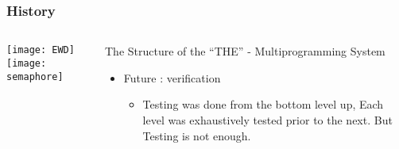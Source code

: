 \begin{frame}[plain]
	\frametitle{History}
	
	
	
	\begin{columns}
		
		\begin{column}{.4\textwidth}
			\centering
			\texttt{[image: EWD]}
			\texttt{[image: semaphore]}
			
			
			
		\end{column}
		
		\begin{column}{.6\textwidth}
			
			The Structure of the “THE” - Multiprogramming System
			\begin{itemize}
				\item Future : verification
				
				\begin{itemize}
					\item Testing was done from the bottom level up, Each level was exhaustively tested prior to the next. But Testing is not enough.
					
				\end{itemize}
				
			\end{itemize}	
			
		\end{column}
		
		
	\end{columns}
	
	
\end{frame}


